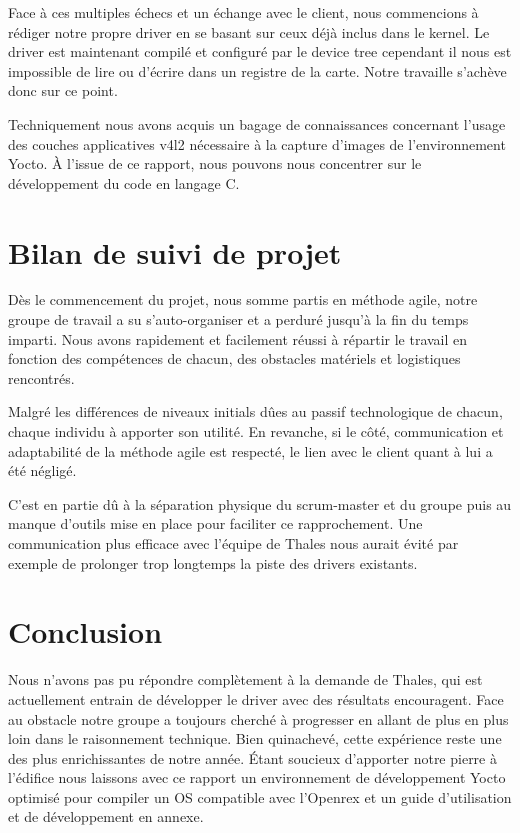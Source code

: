 Face à ces multiples échecs et un échange avec le client, nous commencions à rédiger
notre propre driver en se basant sur ceux déjà inclus dans le kernel. Le driver est
maintenant compilé et configuré par le device tree cependant il nous est impossible de lire
ou d’écrire dans un registre de la carte. Notre travaille s’achève donc sur ce point.\medskip

Techniquement nous avons acquis un bagage de connaissances concernant l’usage des
couches applicatives v4l2 nécessaire à la capture d’images de l’environnement Yocto. À
l’issue de ce rapport, nous pouvons nous concentrer sur le développement du code en
langage C.

\section{Bilan de suivi de projet}

Dès le commencement du projet, nous somme partis en méthode agile, notre groupe de
travail a su s’auto-organiser et a perduré jusqu’à la fin du temps imparti. Nous avons
rapidement et facilement réussi à répartir le travail en fonction des compétences de
chacun, des obstacles matériels et logistiques rencontrés. \medskip

Malgré les différences de niveaux initials dûes au passif technologique de chacun, chaque individu
à apporter son utilité. En revanche, si le côté, communication et adaptabilité de la méthode agile
est respecté, le lien avec le client quant à lui a été négligé. \medskip

C’est en partie dû à la séparation physique du scrum-master et du groupe puis au manque d’outils
mise en place pour faciliter ce rapprochement. Une communication plus efficace avec l’équipe de
Thales nous aurait évité par exemple de prolonger trop longtemps la piste des drivers existants.

\section{Conclusion}

Nous n’avons pas pu répondre complètement à la demande de Thales, qui est
actuellement entrain de développer le driver avec des résultats encouragent. Face au
obstacle notre groupe a toujours cherché à progresser en allant de plus en plus loin dans
le raisonnement technique. Bien quinachevé, cette expérience reste une des plus
enrichissantes de notre année. Étant soucieux d’apporter notre pierre à l’édifice nous
laissons avec ce rapport un environnement de développement Yocto optimisé pour
compiler un OS compatible avec l’Openrex et un guide d’utilisation et de développement
en annexe.